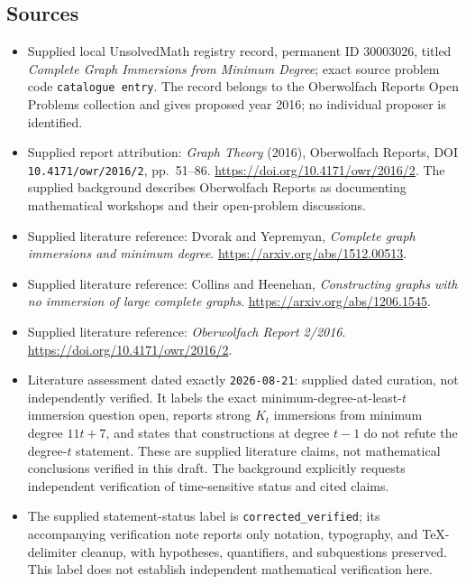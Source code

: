 \documentclass[11pt]{article}
\begin{document}
\subsection{Sources}
\begin{itemize}
\item Supplied local UnsolvedMath registry record, permanent ID \(30003026\), titled \emph{Complete Graph Immersions from Minimum Degree}; exact source problem code \texttt{catalogue entry}. The record belongs to the Oberwolfach Reports Open Problems collection and gives proposed year 2016; no individual proposer is identified.
\item Supplied report attribution: \emph{Graph Theory} (2016), Oberwolfach Reports, DOI \texttt{10.4171/owr/2016/2}, pp.\ 51--86. \url{https://doi.org/10.4171/owr/2016/2}. The supplied background describes Oberwolfach Reports as documenting mathematical workshops and their open-problem discussions.
\item Supplied literature reference: Dvorak and Yepremyan, \emph{Complete graph immersions and minimum degree}. \url{https://arxiv.org/abs/1512.00513}.
\item Supplied literature reference: Collins and Heenehan, \emph{Constructing graphs with no immersion of large complete graphs}. \url{https://arxiv.org/abs/1206.1545}.
\item Supplied literature reference: \emph{Oberwolfach Report 2/2016}. \url{https://doi.org/10.4171/owr/2016/2}.
\item Literature assessment dated exactly \texttt{2026-08-21}: supplied dated curation, not independently verified. It labels the exact minimum-degree-at-least-\(t\) immersion question open, reports strong \(K_t\) immersions from minimum degree \(11t+7\), and states that constructions at degree \(t-1\) do not refute the degree-\(t\) statement. These are supplied literature claims, not mathematical conclusions verified in this draft. The background explicitly requests independent verification of time-sensitive status and cited claims.
\item The supplied statement-status label is \texttt{corrected\_verified}; its accompanying verification note reports only notation, typography, and TeX-delimiter cleanup, with hypotheses, quantifiers, and subquestions preserved. This label does not establish independent mathematical verification here.
\end{itemize}
\end{document}
